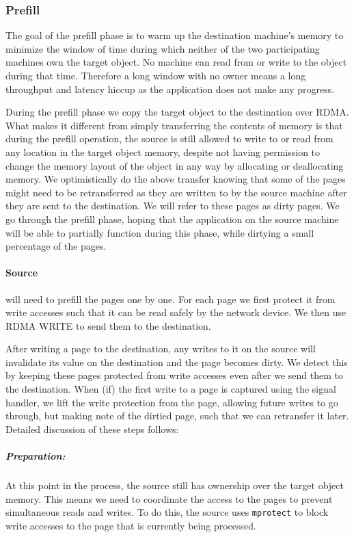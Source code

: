 \subsubsection{Prefill}
The goal of the prefill phase is to warm up the destination machine's memory to
minimize the window of time during which neither of the two participating machines
own the target object. No machine can read from or write to the object during
that time. Therefore a long window with no owner means a long throughput
and latency hiccup as the application does not make any progress.

During the prefill phase we copy the target object to the destination over RDMA.
What makes it different from simply transferring the contents of memory is that
during the prefill operation, the source is still allowed to write to or read from
any location in the target object memory,
despite not having permission to change the memory layout of the object
in any way by allocating or deallocating memory. We optimistically do the above
transfer knowing that some of the pages might need to be retransferred as they
are written to by the source machine after they are sent to the destination.
We will refer to these pages as dirty pages. We go through the prefill phase,
hoping that the application on the source machine will be able to partially
function during this phase, while dirtying a small percentage of the pages.

\paragraph{Source} will need to prefill the pages one by one. For each page
we first protect it from write accesses such that it can be read safely
by the network device. We then use RDMA WRITE to send them to the destination.

After writing a page to the destination, any writes to it on the source will
invalidate its value on the destination and the page becomes dirty. We detect
this by keeping these pages protected from write accesses even after we
send them to the destination. When (if) the first write to a page is captured
using the signal handler, we lift the write protection from the page, allowing
future writes to go through, but making note of the dirtied page, such that
we can retransfer it later. Detailed discussion of these steps follows:

\subparagraph{Preparation:} At this point in the process, the source still
has ownership over the target object memory. This means we need to coordinate
the access to the pages to prevent simultaneous reads and writes. To do this,
the source uses \texttt{mprotect} to block write accesses to the page that
is currently being processed.

